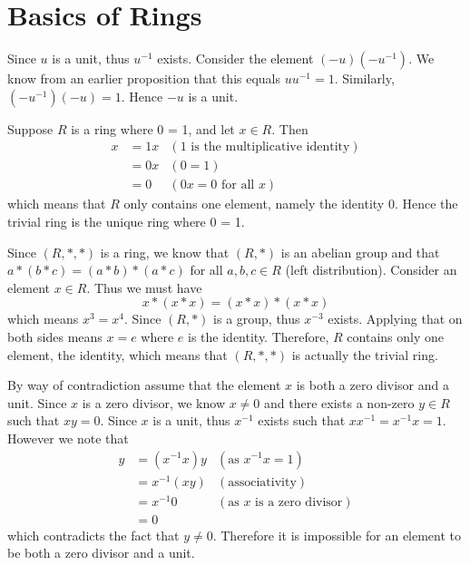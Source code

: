 \section{Basics of Rings}
\begin{questions}
    \item Since $u$ is a unit, thus $u^{-1}$ exists. Consider the element $(-u)(-u^{-1})$. We know from an earlier proposition that this equals $uu^{-1} = 1$. Similarly, $(-u^{-1})(-u) = 1$. Hence $-u$ is a unit.

    \item Suppose $R$ is a ring where 0 = 1, and let $x \in R$. Then
    \begin{align*}
        x &= 1x & (1 \text{ is the multiplicative identity})\\
        &= 0x & (0 = 1)\\
        &= 0 & (0x = 0 \text{ for all }x)
    \end{align*}
    which means that $R$ only contains one element, namely the identity 0. Hence the trivial ring is the unique ring where 0 = 1.

    \item Since $(R, \ast, \ast)$ is a ring, we know that $(R, \ast)$ is an abelian group and that $a \ast(b\ast c) = (a \ast b) \ast (a \ast c)$ for all $a, b, c \in R$ (left distribution). Consider an element $x \in R$. Thus we must have
    \[
        x \ast (x \ast x) = (x \ast x) \ast (x \ast x)    
    \]
    which means $x^3 = x^4$. Since $(R, \ast)$ is a group, thus $x^{-3}$ exists. Applying that on both sides means $x = e$ where $e$ is the identity. Therefore, $R$ contains only one element, the identity, which means that $(R, \ast, \ast)$ is actually the trivial ring.

    \item By way of contradiction assume that the element $x$ is both a zero divisor and a unit. Since $x$ is a zero divisor, we know $x \neq 0$ and there exists a non-zero $y \in R$ such that $xy = 0$. Since $x$ is a unit, thus $x^{-1}$ exists such that $xx^{-1} = x^{-1}x = 1$. However we note that
    \begin{align*}
        y &= (x^{-1}x)y & (\text{as }x^{-1}x = 1)\\
        &= x^{-1}(xy) & (\text{associativity})\\
        &= x^{-1}0 & (\text{as }x \text{ is a zero divisor})\\
        &= 0
    \end{align*}
    which contradicts the fact that $y \neq 0$. Therefore it is impossible for an element to be both a zero divisor and a unit.


\end{questions}
